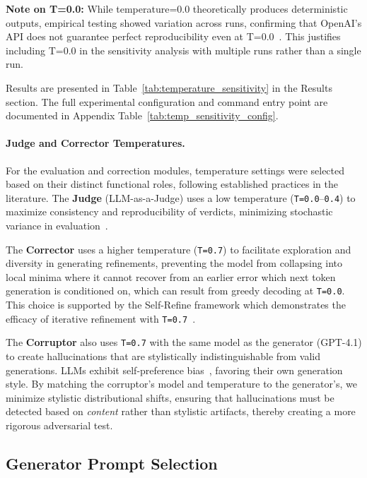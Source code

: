 \textbf{Note on T=0.0:} While temperature=0.0 theoretically produces deterministic outputs, empirical testing showed variation across runs, confirming that OpenAI's API does not guarantee perfect reproducibility even at T=0.0~\cite{openai2024api}. This justifies including T=0.0 in the sensitivity analysis with multiple runs rather than a single run.

Results are presented in Table~\ref{tab:temperature_sensitivity} in the Results section.
The full experimental configuration and command entry point are documented in Appendix Table~\ref{tab:temp_sensitivity_config}.

\paragraph{Judge and Corrector Temperatures.}
For the evaluation and correction modules, temperature settings were selected based on their distinct functional roles, following established practices in the literature. The \textbf{Judge} (LLM-as-a-Judge) uses a low temperature (\texttt{T=0.0}--\texttt{0.4}) to maximize consistency and reproducibility of verdicts, minimizing stochastic variance in evaluation~\citep{liu2023gevalnlgevaluationusing, zheng2024judging}.

The \textbf{Corrector} uses a higher temperature (\texttt{T=0.7}) to facilitate exploration and diversity in generating refinements, preventing the model from collapsing into local minima where it cannot recover from an earlier error which next token generation is conditioned on, which can result from greedy decoding at \texttt{T=0.0}. This choice is supported by the Self-Refine framework which demonstrates the efficacy of iterative refinement with \texttt{T=0.7}~\citep{madaan2023selfrefineiterativerefinementselffeedback}.

The \textbf{Corruptor} also uses \texttt{T=0.7} with the same model as the generator (GPT-4.1) to create hallucinations that are stylistically indistinguishable from valid generations. LLMs exhibit self-preference bias~\citep{zheng2024judging}, favoring their own generation style. By matching the corruptor's model and temperature to the generator's, we minimize stylistic distributional shifts, ensuring that hallucinations must be detected based on \textit{content} rather than stylistic artifacts, thereby creating a more rigorous adversarial test.

\subsection{Generator Prompt Selection}

